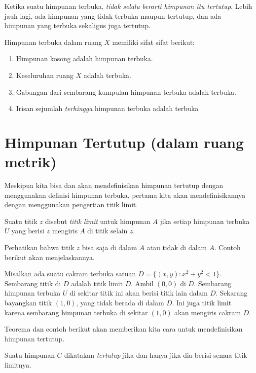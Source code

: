 \documentclass{book}
\begin{document}
Ketika suatu himpunan terbuka, \emph{tidak selalu berarti himpunan itu tertutup}. Lebih jauh lagi, ada himpunan yang tidak terbuka maupun tertutup, dan ada himpunan yang terbuka sekaligus juga tertutup.

Himpunan terbuka dalam ruang $X$ memiliki sifat sifat berikut:
\begin{enumerate}
\item Himpunan kosong adalah himpunan terbuka.
\item Keseluruhan ruang $X$ adalah terbuka.
\item Gabungan dari sembarang kumpulan himpunan terbuka adalah terbuka.
\item Irisan sejumlah \emph{terhingga} himpunan terbuka adalah terbuka
\end{enumerate}

\section{Himpunan Tertutup (dalam ruang metrik)}
Meskipun kita bisa dan akan mendefinisikan himpunan tertutup dengan menggunakan definisi himpunan terbuka, pertama kita akan mendefinisikannya dengan menggunakan pengertian titik limit.

\begin{definisi}
Suatu titik $z$ disebut \emph{titik limit} untuk himpunan $A$ jika setiap himpunan terbuka $U$ yang berisi $z$ mengiris $A$ di titik selain $z$.
\end{definisi}
\noindent Perhatikan bahwa titik $z$ bisa saja di dalam $A$ atau tidak di dalam $A$. Contoh berikut akan menjelaskannya.

\begin{contoh}
Misalkan ada suatu cakram terbuka satuan $D = \{(x,y): x^2 + y^2 < 1\}$. Sembarang titik di $D$ adalah titik limit $D$. Ambil $(0,0)$ di $D$. Sembarang himpunan terbuka $U$ di sekitar titik ini akan berisi titik lain dalam $D$. Sekarang bayangkan titik $(1,0)$, yang tidak berada di dalam $D$. Ini juga titik limit karena sembarang himpunan terbuka di sekitar $(1,0)$ akan mengiris cakram $D$.
\end{contoh}
\noindent Teorema dan contoh berikut akan memberikan kita cara untuk mendefinisikan himpunan tertutup.

\begin{definisi}
Suatu himpunan $C$ dikatakan \emph{tertutup} jika dan hanya jika dia berisi semua titik limitnya.
\end{definisi}
\end{document}
